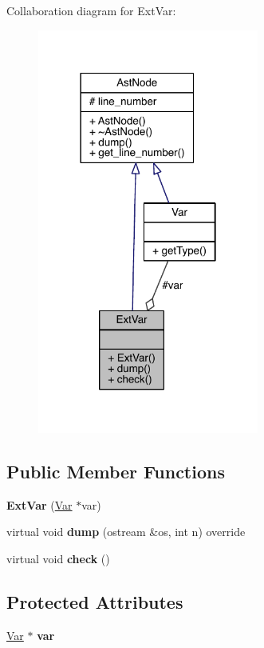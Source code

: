 Collaboration diagram for Ext\+Var\+:\nopagebreak
\begin{figure}[H]
\begin{center}
\leavevmode
\includegraphics[width=206pt]{class_ext_var__coll__graph}
\end{center}
\end{figure}
\subsection*{Public Member Functions}
\begin{DoxyCompactItemize}
\item 
\mbox{\label{class_ext_var_abb6174d2fdfb84b434f95172dfd0076c}} 
{\bfseries Ext\+Var} (\hyperlink{class_var}{Var} $\ast$var)
\item 
\mbox{\label{class_ext_var_af75fe07af96da67a210f4601589d5d1b}} 
virtual void {\bfseries dump} (ostream \&os, int n) override
\item 
\mbox{\label{class_ext_var_a98ba57934575d616f570021e644ae071}} 
virtual void {\bfseries check} ()
\end{DoxyCompactItemize}
\subsection*{Protected Attributes}
\begin{DoxyCompactItemize}
\item 
\mbox{\label{class_ext_var_af3338fd1abf1a794cd1f24e7eed81b78}} 
\hyperlink{class_var}{Var} $\ast$ {\bfseries var}
\end{DoxyCompactItemize}


